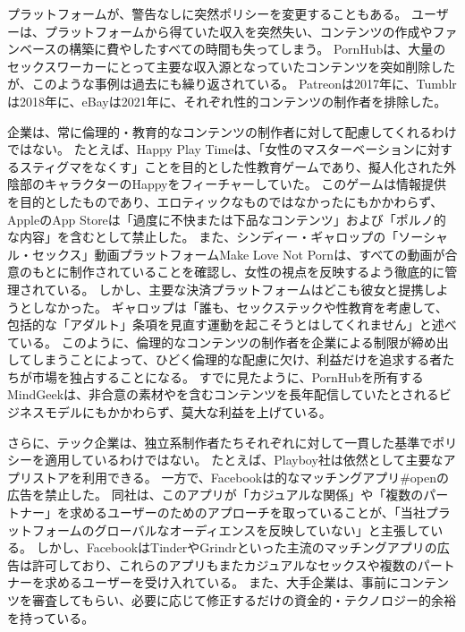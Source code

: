 \documentclass[paper=a4,book,openany]{jlreq} \usepackage{mystyle}
\begin{document}
プラットフォームが、警告なしに突然ポリシーを変更することもある。
ユーザーは、プラットフォームから得ていた収入を突然失い、コンテンツの作成やファンベースの構築に費やしたすべての時間も失ってしまう。
PornHubは、大量のセックスワーカーにとって主要な収入源となっていたコンテンツを突如削除したが、このような事例は過去にも繰り返されている。
Patreonは2017年に、Tumblrは2018年に、eBayは2021年に、それぞれ性的コンテンツの制作者を排除した\citep{cooper17:_real_conseq_patreon_adult_conten_crack}。

企業は、常に倫理的・教育的なコンテンツの制作者に対して配慮してくれるわけではない。
たとえば、Happy Play Timeは、「女性のマスターベーションに対するスティグマをなくす」ことを目的とした性教育ゲームであり、擬人化された外陰部のキャラクターのHappyをフィーチャーしていた。
このゲームは情報提供を目的としたものであり、エロティックなものではなかったにもかかわらず、AppleのApp Storeは「過度に不快または下品なコンテンツ」および「ポルノ的な内容」を含むとして禁止した\citep{dhapolamay14:_apples_rejec_happy_playt_app}。
また、シンディー・ギャロップの「ソーシャル・セックス」動画プラットフォームMake Love Not Pornは、すべての動画が合意のもとに制作されていることを確認し、女性の視点を反映するよう徹底的に管理されている。
しかし、主要な決済プラットフォームはどこも彼女と提携しようとしなかった。
ギャロップは「誰も、セックステックや性教育を考慮して、包括的な「アダルト」条項を見直す運動を起こそうとはしてくれません」と述べている\citep{deighton20:_why_sex_start_face_uphil_paymen_battl}。
このように、倫理的なコンテンツの制作者を企業による制限が締め出してしまうことによって、ひどく倫理的な配慮に欠け、利益だけを追求する者たちが市場を独占することになる。
すでに見たように、PornHubを所有するMindGeekは、非合意の素材やを含むコンテンツを長年配信していたとされるビジネスモデルにもかかわらず、莫大な利益を上げている。

さらに、テック企業は、独立系制作者たちそれぞれに対して一貫した基準でポリシーを適用しているわけではない。
たとえば、Playboy社は依然として主要なアプリストアを利用できる。
一方で、Facebookは的なマッチングアプリ\#openの広告を禁止した。
同社は、このアプリが「カジュアルな関係」や「複数のパートナー」を求めるユーザーのためのアプローチを取っていることが、「当社プラットフォームのグローバルなオーディエンスを反映していない」と主張している\citep{kibbe20:_faceb_has_banned_ads_kink}。
しかし、FacebookはTinderやGrindrといった主流のマッチングアプリの広告は許可しており、これらのアプリもまたカジュアルなセックスや複数のパートナーを求めるユーザーを受け入れている。
また、大手企業は、事前にコンテンツを審査してもらい、必要に応じて修正するだけの資金的・テクノロジー的余裕を持っている。
\end{document}
